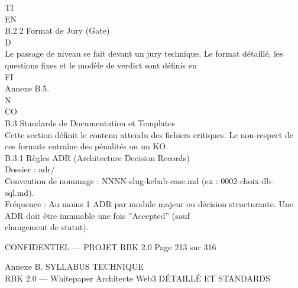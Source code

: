 \documentclass[12pt,landscape,a4paper]{article}
\newenvironment{confidential}
{\begin{tcolorbox}[
    colback=rbkred!5!white,
    colframe=rbkred!75!black,
    title=CONFIDENTIEL,
    fonttitle=\bfseries\color{white},
    coltitle=rbkred!75!black,
    breakable,
    enhanced,
    frame hidden,
    borderline west={2pt}{0pt}{rbkred!75!black}
]}
{\end{tcolorbox}}
\begin{document}
\vspace{0.5em}
\vspace{0.5em}
\vspace{0.5em}
TI\\
EN\\
B.2.2 Format de Jury (Gate)\\
\vspace{0.5em}
\vspace{0.5em}
\vspace{0.5em}
\vspace{0.5em}
D\\
Le passage de niveau se fait devant un jury technique. Le format détaillé, les questions fixes et le modèle de verdict sont définis en\\
\vspace{0.5em}
\vspace{0.5em}
\vspace{0.5em}
\vspace{0.5em}
FI\\
Annexe B.5.\\
\vspace{0.5em}
\vspace{0.5em}
N\\
CO\\
B.3 Standards de Documentation et Templates\\
Cette section définit le contenu attendu des fichiers critiques. Le non-respect de ces formats entraîne des pénalités ou un KO.\\
\vspace{0.5em}
\vspace{0.5em}
B.3.1 Règles ADR (Architecture Decision Records)\\
Dossier : adr/\\
Convention de nommage : NNNN-slug-kebab-case.md (ex : 0002-choix-db-sql.md).\\
Fréquence : Au moins 1 ADR par module majeur ou décision structurante. Une ADR doit être immuable une fois ”Accepted” (sauf\\
changement de statut).\\
\vspace{0.5em}
\vspace{0.5em}
\vspace{0.5em}
\begin{confidential}CONFIDENTIEL — PROJET RBK 2.0                                 Page 213 sur 316\end{confidential}
Annexe B. SYLLABUS TECHNIQUE\\
RBK 2.0 — Whitepaper Architecte Web3                                                                              DÉTAILLÉ ET STANDARDS\\
\end{document}
